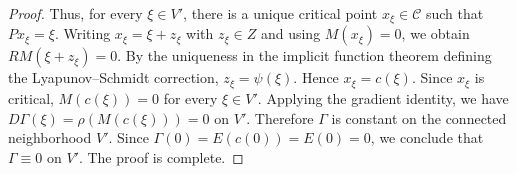 \documentclass[10pt,a4paper]{amsart}
\begin{document}
\begin{proof}
\medskip
Thus, for every $\xi \in V'$, there is a unique critical point $x_\xi \in \mathcal{C}$ such that
$P x_\xi = \xi$. Writing $x_\xi=\xi+z_\xi$ with $z_\xi\in Z$ and using $M(x_\xi)=0$, we obtain $RM(\xi+z_\xi)=0$.
By the uniqueness in the implicit function theorem defining the Lyapunov--Schmidt correction,
$z_\xi = \psi(\xi)$. Hence $x_\xi = c(\xi)$. Since $x_\xi$ is critical,
$M(c(\xi)) = 0$ for every $\xi \in V'$.
Applying the gradient identity, we have $D\Gamma(\xi) = \rho(M(c(\xi))) = 0$
on $V'$. Therefore $\Gamma$ is constant on the connected neighborhood $V'$. Since
$\Gamma(0) = E(c(0)) = E(0) = 0$, we conclude that
$\Gamma \equiv 0$ on $V'$. The proof is complete.
\end{proof}
\end{document}
